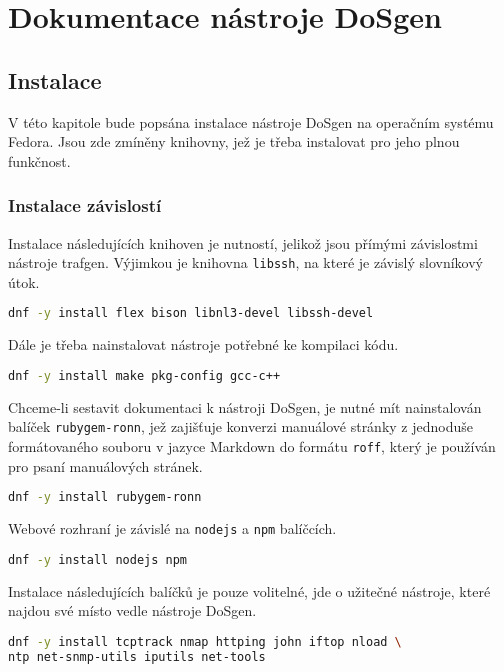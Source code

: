 \chapter{Dokumentace nástroje DoSgen}

\section{Instalace}
V této kapitole bude popsána instalace nástroje DoSgen na operačním systému Fedora. Jsou zde zmíněny knihovny, jež je třeba instalovat pro jeho plnou funkčnost. 

\subsection{Instalace závislostí}
\noindent Instalace následujících knihoven je nutností, jelikož jsou přímými závislostmi nástroje trafgen. Výjimkou je knihovna \texttt{libssh}, na které je závislý slovníkový útok.
\begin{lstlisting}[language=bash]
dnf -y install flex bison libnl3-devel libssh-devel
\end{lstlisting}

\noindent Dále je třeba nainstalovat nástroje potřebné ke kompilaci kódu.
\begin{lstlisting}[language=bash]
dnf -y install make pkg-config gcc-c++
\end{lstlisting}

\noindent Chceme-li sestavit dokumentaci k nástroji DoSgen, je nutné mít nainstalován balíček \texttt{rubygem-ronn}, jež zajišťuje konverzi manuálové stránky z jednoduše formátovaného souboru v jazyce Markdown do formátu \texttt{roff}, který je používán pro psaní manuálových stránek.

\begin{lstlisting}[language=bash]
dnf -y install rubygem-ronn
\end{lstlisting}

\noindent Webové rozhraní je závislé na \texttt{nodejs} a \texttt{npm} balíčcích.
\begin{lstlisting}[language=bash]
dnf -y install nodejs npm
\end{lstlisting}



\noindent Instalace následujících balíčků je pouze volitelné, jde o užitečné nástroje, které najdou své místo vedle nástroje DoSgen.
\begin{lstlisting}[language=bash]
dnf -y install tcptrack nmap httping john iftop nload \
ntp net-snmp-utils iputils net-tools
\end{lstlisting}

